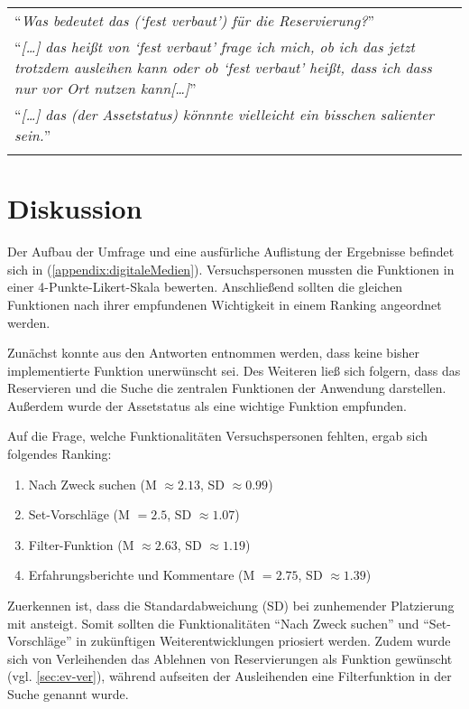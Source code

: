 \begin{longtable}{p{}} \arrayrulecolor{maincolor}\hline
        \enquote{\textit{Was bedeutet das (\enquote{fest verbaut}) für die Reservierung?}} \\
        \enquote{\textit{[\dots] das heißt von \enquote{fest verbaut} frage ich mich,
                        ob ich das jetzt trotzdem ausleihen kann oder ob \enquote{fest verbaut} heißt,
        dass ich dass nur vor Ort nutzen kann[\dots]}}                                     \\
        \enquote{\textit{[\dots] das (der Assetstatus) könnnte vielleicht ein bisschen
        salienter sein.}}                                                                  \\
        \arrayrulecolor{maincolor}\hline
\end{longtable}


\newpage
\section{Diskussion}
\label{sec:disc}
Der Aufbau der Umfrage und eine ausfürliche Auflistung der Ergebnisse befindet sich in
(\ref{appendix:digitaleMedien}). Versuchspersonen mussten die Funktionen in einer
4-Punkte-Likert-Skala bewerten. Anschließend sollten die gleichen Funktionen nach ihrer empfundenen
Wichtigkeit in einem Ranking angeordnet werden.

Zunächst konnte aus den Antworten entnommen werden, dass keine bisher implementierte
Funktion unerwünscht sei. Des Weiteren ließ sich folgern, dass das Reservieren und die Suche die
zentralen Funktionen der Anwendung darstellen. Außerdem wurde der Assetstatus als eine wichtige
Funktion empfunden.

Auf die Frage, welche Funktionalitäten Versuchspersonen fehlten, ergab sich folgendes Ranking:
\begin{enumerate}
        \item Nach Zweck suchen (M \(\approx 2.13\), SD \(\approx 0.99\))
        \item Set-Vorschläge (M \( = 2.5\), SD \(\approx 1.07\))
        \item Filter-Funktion (M \( \approx 2.63\), SD \(\approx 1.19\))
        \item Erfahrungsberichte und Kommentare (M \( = 2.75\), SD \(\approx 1.39\))
\end{enumerate}

Zuerkennen ist, dass die Standardabweichung (SD) bei zunhemender Platzierung mit ansteigt. Somit
sollten die Funktionalitäten \enquote{Nach Zweck suchen} und \enquote{Set-Vorschläge}  in
zukünftigen Weiterentwicklungen priosiert werden.  Zudem wurde sich von Verleihenden das Ablehnen von
Reservierungen als Funktion gewünscht (vgl. \ref{sec:ev-ver}), während aufseiten der Ausleihenden
eine Filterfunktion in der Suche genannt wurde.




